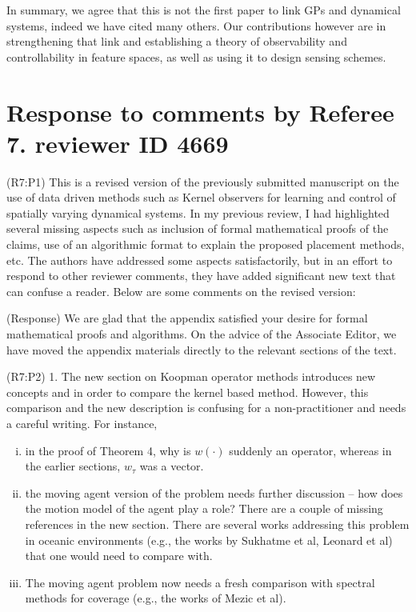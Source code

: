 \documentclass{letter}
\begin{document}
In summary, we agree that this is not the first paper to link GPs and dynamical systems, indeed we have cited many others. Our contributions however are in strengthening that link and establishing a theory of observability and controllability  in feature spaces, as well as using it to design sensing schemes.

\section{Response to comments by Referee 7. reviewer ID 4669}

{\color{red}(R7:P1)} This is a revised version of the previously submitted manuscript on the use of data driven methods such as Kernel observers for learning and control of spatially varying dynamical systems. In my previous review, I had highlighted several missing aspects such as inclusion of formal mathematical proofs of the claims, use of an algorithmic format to explain the proposed placement methods, etc. The authors have addressed some aspects satisfactorily, but in an effort to respond to other reviewer comments, they have added significant new text that can confuse a reader. Below are some comments on the revised version:

{\color{red}(Response)} We are glad that the appendix satisfied your desire for formal mathematical proofs and algorithms. On the advice of the Associate Editor, we have moved the appendix materials directly to the relevant sections of the text.

{\color{red}(R7:P2)} 1. The new section on Koopman operator methods introduces new concepts and in order to compare the kernel based method. However, this comparison and the new description is confusing for a non-practitioner and needs a careful writing. For instance,
\begin{enumerate}[(i)]
	\item in the proof of Theorem 4, why is $w(\cdot)$ suddenly an operator, whereas in the earlier sections, $w_{\tau}$ was a vector.
	\item the moving agent version of the problem needs further discussion -- how does the motion model of the agent play a role? There are a couple of missing references in the new section. There are several works	addressing this problem in oceanic environments (e.g., the works by	Sukhatme et al, Leonard et al) that one would need to compare with.
	\item The moving agent problem now needs a fresh comparison with spectral methods for coverage (e.g., the works of Mezic et al). 
\end{enumerate}
\end{document}
